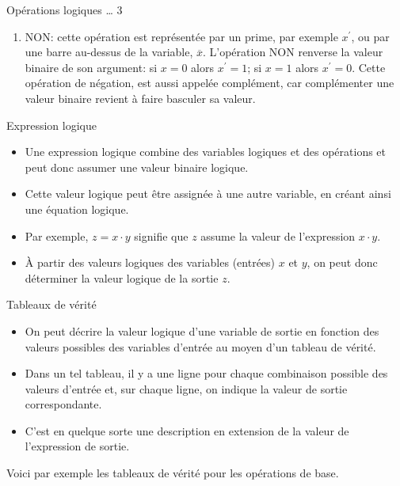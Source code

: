 \documentclass[presentation]{beamer}
\begin{document}
\begin{frame}[label={sec:org5926c57}]{Opérations logiques \ldots{} 3}
\begin{enumerate}
\item NON: cette opération est représentée par un prime, par
exemple \(x^\prime\), ou par une barre au-dessus de la variable,
\(\overline{x}\).  L'opération NON renverse la valeur binaire de
son argument: si \(x =0\) alors \(x^ \prime = 1\); si \(x =1\)
alors \(x^ \prime = 0\). Cette opération de négation, est aussi
appelée complément, car complémenter une valeur binaire revient à
faire basculer sa valeur.
\end{enumerate}
\end{frame}

\begin{frame}[label={sec:orga74d6a9}]{Expression logique}
\begin{itemize}
\item Une expression logique combine des variables logiques et des opérations et peut donc assumer une valeur binaire logique.

\item Cette valeur logique peut être assignée à une autre variable, en créant ainsi une équation logique.

\item Par exemple, \(z = x \cdot y\) signifie que \(z\) assume la valeur de l'expression \(x \cdot y\).

\item À partir des valeurs logiques des variables (entrées) \(x\) et \(y\), on peut donc déterminer la valeur logique de la sortie \(z\).
\end{itemize}
\end{frame}

\begin{frame}[label={sec:orge9ea3c2}]{Tableaux de vérité}
\begin{itemize}
\item On peut décrire la valeur logique d'une variable de sortie en fonction des valeurs possibles des variables d'entrée au moyen d'un tableau de vérité.

\item Dans un tel tableau, il y a une ligne pour chaque combinaison possible des valeurs d'entrée et, sur chaque ligne, on indique la valeur de sortie correspondante.

\item C'est en quelque sorte une description en extension de la valeur de l'expression de sortie.
\end{itemize}

Voici par exemple les tableaux de vérité pour les opérations de base.
\end{frame}
\end{document}
